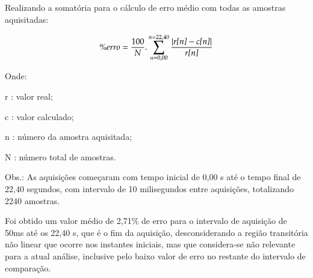 Realizando a somatória para o cálculo de erro médio com todas as amostras aquisitadas: 

\begin{equation}
 \% erro = \frac{100}{N} . \sum_{n = 0,00}^{n=22,40} {\frac{| \text{\emph{r[n]}} -\text{\emph{c[n]}} |}{\text{\emph{r[n]}}} } 
\end{equation}


Onde:

\setlength{\parindent}{2cm}
r : valor real; 

c : valor calculado;

n : número da amostra aquisitada;

N : número total de amostras.

Obs.: As aquisições começaram com tempo inicial de 0,00 s até o tempo final de 22,40 segundos, com intervalo de 10 milisegundos entre aquisições, totalizando 2240 amostras.

\setlength{\parindent}{1cm}



Foi obtido um valor médio de 2,71\% de erro 
para o intervalo de aquisição de 50ms até os 22,40 s, 
que é o fim da aquisição, 
desconsiderando a região transitória não linear 
que ocorre nos instantes iniciais, 
mas que considera-se não relevante para a atual análise, 
inclusive pelo baixo valor de erro no restante do intervalo de comparação.




